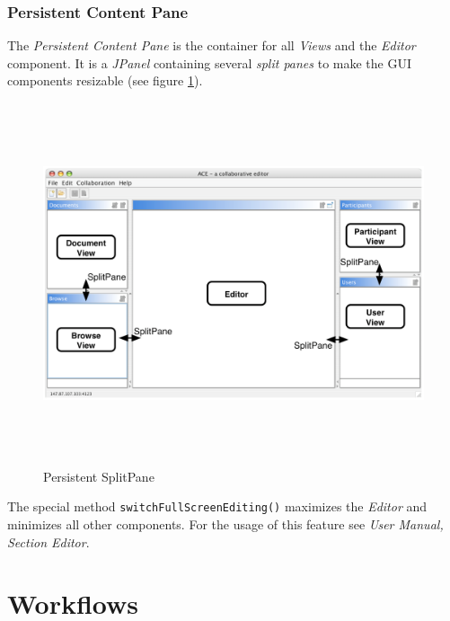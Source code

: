 \subsubsection{Persistent Content Pane}
The \textit{Persistent Content Pane} is the container for all \textit{Views} and the \textit{Editor} component. It is a \textit{JPanel} containing several \textit{split panes} to make the GUI components resizable (see figure \ref{application_splitpane}).
\begin{figure}[H]
\begin{center}
  \includegraphics[height=4.19in, width=6.69in]{../images/finalreport/application_splitpane.eps}
\caption{Persistent SplitPane}
\label{application_splitpane}
\end{center}
\end{figure}
The special method \texttt{switchFullScreenEditing()} maximizes the \textit{Editor} and minimizes all other components. For the usage of this feature see \textit{User Manual, Section Editor}.

\section{Workflows}

